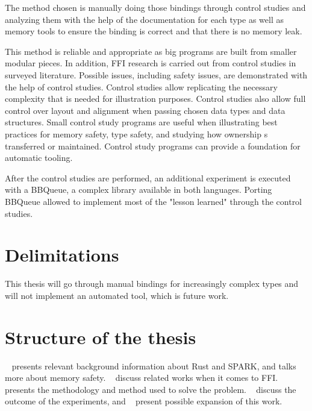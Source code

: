 \documentclass[nomenclature, english, bibtex]{kththesis}
\newcommand*{\sweExpl}[1]{\todo[inline, backgroundcolor=kth-lightblue40]{#1}}  %
\begin{document}
The method chosen is manually doing those bindings through control studies and analyzing them with the help of the documentation for each type as well as memory tools to ensure the binding is correct and that there is no memory leak. 

This method is reliable and appropriate as big programs are built from smaller modular pieces. In addition, \gls{FFI} research is carried out from control studies in surveyed literature. Possible issues, including safety issues, are demonstrated with the help of control studies. Control studies allow replicating the necessary complexity that is needed for illustration purposes. Control studies also allow full control over layout and alignment when passing chosen data types and data structures.
Small control study programs are useful when illustrating best practices for memory safety, type safety, and studying how ownership s transferred or maintained.
Control study programs can provide a foundation for automatic tooling.

After the control studies are performed, an additional experiment is executed with a BBQueue, a complex library available in both languages. Porting BBQueue allowed to implement most of the "lesson learned" through the control studies.


\section{Delimitations}


This thesis will go through manual bindings for increasingly complex types and will not implement an automated tool, which is future work.

\section{Structure of the thesis}
~ presents relevant background information about Rust and SPARK, and talks more about memory safety.  
~ discuss related works when it comes to \gls{FFI}.   presents the methodology and method used to solve the problem. ~ discuss the outcome of the experiments, and ~ present possible expansion of this work.


\end{document}
